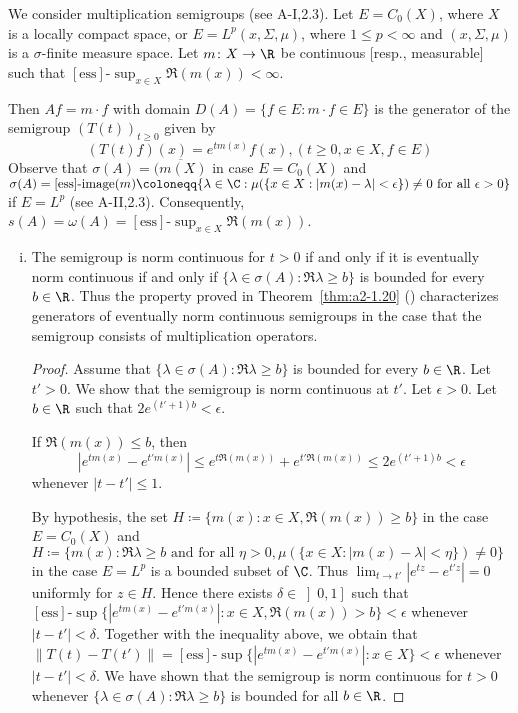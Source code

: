 \begin{example}\label{ex:a2-1.28}
We consider multiplication semigroups (see A-I,2.3).
Let $E = C_{0}(X)$, where $X$ is a locally compact space, or $E = L^{p}(x,\Sigma,\mu)$, where $1 \leq p < \infty$ and $(x,\Sigma,\mu)$ is a $\sigma$-finite measure space.
Let $m \colon X \to \R$ be continuous [resp., measurable] such that $[\text{ess}]\text{-}\sup_{x \in X} \Re(m(x)) < \infty$.

Then $Af = m \cdot f$ with domain $D(A) = \{f \in E : m \cdot f \in E\}$ is the generator of the semigroup $(T(t))_{t \geq 0}$ given by
\[
    (T(t)f)(x) = e^{tm(x)}f(x), (t \geq 0, x \in X, f \in E )
\]
Observe that $\sigma(A) = \overline{(m(X)}$ in case $E = C_{0}(X)$ 
and 
$\sigma(A) = [\text{ess}]\text{-}\text{image}(m) \coloneqq \{\lambda \in \C : \mu(\{x \in X : |m(x)-\lambda| < \epsilon\}) \neq 0 \text{ for all } \epsilon > 0\}$ 
if $E = L^{p}$ (see A-II,2.3).
Consequently, $s(A) = \omega(A) = [\text{ess}]\text{-}\sup_{x \in X} \Re(m(x))$.

\begin{enumerate}[(i), wide]
\item \label{ex:a2-1.28-1}
The semigroup is norm continuous for $t > 0$ if and only if it is eventually norm continuous if and only if 
$\{\lambda \in \sigma(A) : \Re\lambda \geq b\}$ 
is bounded for every $b \in \R$.
Thus the property proved in Theorem~\ref{thm:a2-1.20} () characterizes generators of eventually norm continuous semigroups in the case that the semigroup consists of multiplication operators.
\begin{proof}
Assume that $\{\lambda \in \sigma(A) : \Re\lambda \geq b\}$ is bounded for every $b \in \R$.
Let $t' > 0$.
We show that the semigroup is norm continuous at $t'$.
Let $\epsilon > 0$.
Let $b \in \R$ such that $2e^{(t'+1)b} < \epsilon$.

If $\Re(m(x)) \leq b$, then
\[
    |e^{tm(x)} - e^{t'm(x)}| \leq e^{t\Re(m(x))} + e^{t'\Re(m(x))} \leq 2e^{(t'+1)b} < \epsilon
\]
whenever $|t-t'| \leq 1$.

By hypothesis, the set 
$H \coloneqq \{m(x) : x \in X, \Re(m(x)) \geq b\}$ 
in the case $E = C_{0}(X)$ 
and $H \coloneqq \{m(x) : \Re\lambda \geq b \text{ and for all } \eta > 0, 
\mu(\{x \in X : |m(x)-\lambda| < \eta \}) \neq 0\}$
in the case $E = L^{p}$ 
is a bounded subset of $\C$.
Thus $\lim_{t \to t'} |e^{tz} - e^{t'z}| = 0$ 
uniformly for $z \in H$.
Hence there exists $\delta \in \left]0,1\right]$ such that 
$[\text{ess}]\text{-}\sup\{|e^{tm(x)} - e^{t'm(x)}| : x \in X, \Re(m(x)) > b\} < \epsilon$ 
whenever $|t-t'| < \delta$.
Together with the inequality above, we obtain that 
$\|T(t) - T(t')\| = [\text{ess}]\text{-}\sup\{|e^{tm(x)} - e^{t'm(x)}| : x \in X\} < \epsilon$ 
whenever $|t-t'| < \delta$.
We have shown that the semigroup is norm continuous for $t > 0$ whenever $\{\lambda \in \sigma(A) : \Re\lambda \geq b\}$ is bounded for all $b \in \R$.
\end{proof}


\end{enumerate}
\end{example}
